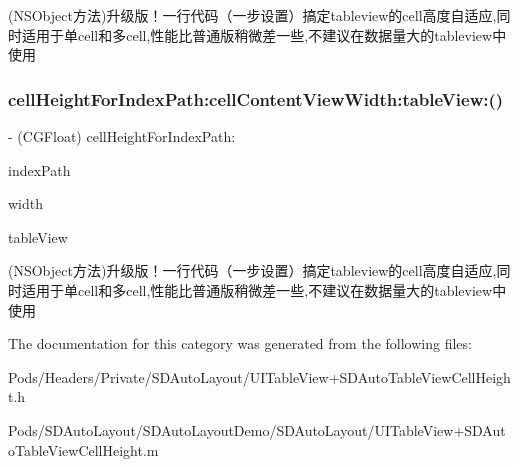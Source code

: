 (N\+S\+Object方法)升级版！一行代码（一步设置）搞定tableview的cell高度自适应,同时适用于单cell和多cell,性能比普通版稍微差一些,不建议在数据量大的tableview中使用 \mbox{\label{category_n_s_object_07_s_d_any_object_auto_cell_height_08_aa618c83e951010f546ea1f085eae72c7}} 
\subsubsection{\texorpdfstring{cell\+Height\+For\+Index\+Path\+:cell\+Content\+View\+Width\+:table\+View\+:()}{cellHeightForIndexPath:cellContentViewWidth:tableView:()}\hspace{0.1cm}{\footnotesize\ttfamily [3/3]}}
{\footnotesize\ttfamily -\/ (C\+G\+Float) cell\+Height\+For\+Index\+Path\+: \begin{DoxyParamCaption}\item[{(N\+S\+Index\+Path $\ast$)}]{index\+Path }\item[{cellContentViewWidth:(C\+G\+Float)}]{width }\item[{tableView:(U\+I\+Table\+View $\ast$)}]{table\+View }\end{DoxyParamCaption}}

(N\+S\+Object方法)升级版！一行代码（一步设置）搞定tableview的cell高度自适应,同时适用于单cell和多cell,性能比普通版稍微差一些,不建议在数据量大的tableview中使用 

The documentation for this category was generated from the following files\+:\begin{DoxyCompactItemize}
\item 
Pods/\+Headers/\+Private/\+S\+D\+Auto\+Layout/U\+I\+Table\+View+\+S\+D\+Auto\+Table\+View\+Cell\+Height.\+h\item 
Pods/\+S\+D\+Auto\+Layout/\+S\+D\+Auto\+Layout\+Demo/\+S\+D\+Auto\+Layout/U\+I\+Table\+View+\+S\+D\+Auto\+Table\+View\+Cell\+Height.\+m\end{DoxyCompactItemize}
